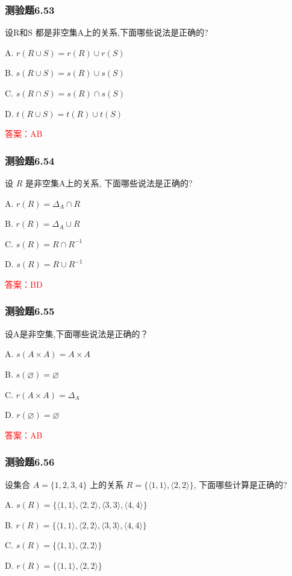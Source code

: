 \documentclass[UTF8, heading=true]{ctexart}
\begin{document}
\subsubsection{测验题6.53}
设R和S 都是非空集A上的关系,下面哪些说法是正确的?

A. $r(R \cup S)=r(R) \cup r(S)$

B. $s(R \cup S)=s(R) \cup s(S)$

C. $s(R \cap S)=s(R) \cap s(S)$

D. $t(R \cup S)=t(R) \cup t(S)$

\textcolor{red}{答案：AB}


\subsubsection{测验题6.54}
设 $R$ 是非空集A上的关系, 下面哪些说法是正确的?

A. $r(R)=\Delta_A \cap R$

B. $r(R)=\Delta_A \cup R$

C. $s(R)=R \cap R^{-1}$

D. $s(R)=R \cup R^{-1}$

\textcolor{red}{答案：BD}

\subsubsection{测验题6.55}
设A是非空集,下面哪些说法是正确的？

A. $s(A \times A)=A \times A$

B. $s(\varnothing)=\varnothing$

C. $r(A \times A)=\Delta_A$

D. $r(\varnothing)=\varnothing$

\textcolor{red}{答案：AB}

\subsubsection{测验题6.56}

设集合 $A=\{1,2,3,4\}$ 上的关系 $R=\{\langle 1,1\rangle,\langle 2,2\rangle\}$, 下面哪些计算是正确的?

A. $s(R)=\{\langle 1,1\rangle,\langle 2,2\rangle,\langle 3,3\rangle,\langle 4,4\rangle\}$

B. $r(R)=\{\langle 1,1\rangle,\langle 2,2\rangle,\langle 3,3\rangle,\langle 4,4\rangle\}$

C. $s(R)=\{\langle 1,1\rangle,\langle 2,2\rangle\}$

D. $r(R)=\{\langle 1,1\rangle,\langle 2,2\rangle\}$
\end{document}
